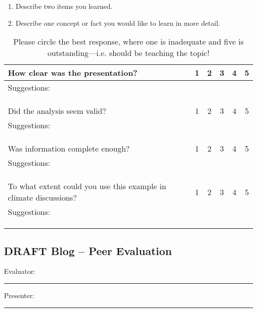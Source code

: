 \documentclass{article}\usepackage[]{graphicx}\usepackage[]{color}
\begin{document}
\begin{enumerate}
 \setlength\itemsep{4em}
  \item Describe two items you learned.
  \item Describe one concept or fact you would like to learn in more detail.
\end{enumerate}


\begin{table}[ht!]
\caption{Please circle the best response, where one is inadequate and five is outstanding---i.e. should be teaching the topic!}
\begin{tabular}{|p{4in}|ccccc|}\hline
How clear was the presentation?     & 1 & 2 & 3 & 4 & 5 \\ \hline
Suggestions: &&&&& \\ &&&&& \\ &&&&& \\
&&&&& \\ \hline
Did the analysis seem valid?        & 1 & 2 & 3 & 4 & 5 \\ \hline
Suggestions: &&&&& \\ &&&&& \\ &&&&& \\
&&&&& \\ \hline
Was information complete enough?            & 1 & 2 & 3 & 4 & 5 \\ \hline
Suggestions: &&&&& \\ &&&&& \\ &&&&& \\
&&&&& \\ \hline
To what extent could you use this example in climate discussions?            & 1 & 2 & 3 & 4 & 5 \\ \hline
Suggestions: &&&&& \\ &&&&& \\ &&&&& \\
&&&&& \\ \hline
\end{tabular}
\end{table}

\clearpage
\newpage
\subsection{DRAFT Blog -- Peer Evaluation}

\bigskip
Evaluator: \rule{7cm}{0.4pt}

\bigskip

\noindent Presenter: \rule{7cm}{0.4pt}
\end{document}
